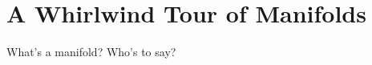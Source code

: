 \documentclass[../main.tex]{subfiles}
\begin{document}
\chapter{A Whirlwind Tour of Manifolds}
\label{ch:manifolds}

What's a manifold? Who's to say?
\end{document}
